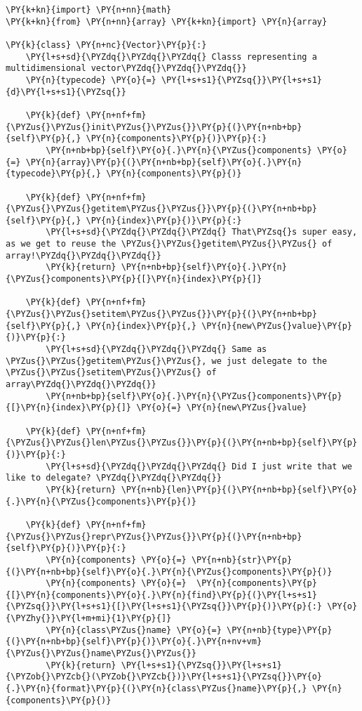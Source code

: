 \begin{Verbatim}[label=\makebox{\url{https://github.com/lucabaldini/cmepda/tree/master/slides/latex/snippets/vector\_random\_access.py}},commandchars=\\\{\}]
\PY{k+kn}{import} \PY{n+nn}{math}
\PY{k+kn}{from} \PY{n+nn}{array} \PY{k+kn}{import} \PY{n}{array}

\PY{k}{class} \PY{n+nc}{Vector}\PY{p}{:}
    \PY{l+s+sd}{\PYZdq{}\PYZdq{}\PYZdq{} Classs representing a multidimensional vector\PYZdq{}\PYZdq{}\PYZdq{}}    
    \PY{n}{typecode} \PY{o}{=} \PY{l+s+s1}{\PYZsq{}}\PY{l+s+s1}{d}\PY{l+s+s1}{\PYZsq{}}
    
    \PY{k}{def} \PY{n+nf+fm}{\PYZus{}\PYZus{}init\PYZus{}\PYZus{}}\PY{p}{(}\PY{n+nb+bp}{self}\PY{p}{,} \PY{n}{components}\PY{p}{)}\PY{p}{:}
        \PY{n+nb+bp}{self}\PY{o}{.}\PY{n}{\PYZus{}components} \PY{o}{=} \PY{n}{array}\PY{p}{(}\PY{n+nb+bp}{self}\PY{o}{.}\PY{n}{typecode}\PY{p}{,} \PY{n}{components}\PY{p}{)}
        
    \PY{k}{def} \PY{n+nf+fm}{\PYZus{}\PYZus{}getitem\PYZus{}\PYZus{}}\PY{p}{(}\PY{n+nb+bp}{self}\PY{p}{,} \PY{n}{index}\PY{p}{)}\PY{p}{:}
        \PY{l+s+sd}{\PYZdq{}\PYZdq{}\PYZdq{} That\PYZsq{}s super easy, as we get to reuse the \PYZus{}\PYZus{}getitem\PYZus{}\PYZus{} of array!\PYZdq{}\PYZdq{}\PYZdq{}}
        \PY{k}{return} \PY{n+nb+bp}{self}\PY{o}{.}\PY{n}{\PYZus{}components}\PY{p}{[}\PY{n}{index}\PY{p}{]}
    
    \PY{k}{def} \PY{n+nf+fm}{\PYZus{}\PYZus{}setitem\PYZus{}\PYZus{}}\PY{p}{(}\PY{n+nb+bp}{self}\PY{p}{,} \PY{n}{index}\PY{p}{,} \PY{n}{new\PYZus{}value}\PY{p}{)}\PY{p}{:}
        \PY{l+s+sd}{\PYZdq{}\PYZdq{}\PYZdq{} Same as \PYZus{}\PYZus{}getitem\PYZus{}\PYZus{}, we just delegate to the \PYZus{}\PYZus{}setitem\PYZus{}\PYZus{} of array\PYZdq{}\PYZdq{}\PYZdq{}}
        \PY{n+nb+bp}{self}\PY{o}{.}\PY{n}{\PYZus{}components}\PY{p}{[}\PY{n}{index}\PY{p}{]} \PY{o}{=} \PY{n}{new\PYZus{}value}
    
    \PY{k}{def} \PY{n+nf+fm}{\PYZus{}\PYZus{}len\PYZus{}\PYZus{}}\PY{p}{(}\PY{n+nb+bp}{self}\PY{p}{)}\PY{p}{:}
        \PY{l+s+sd}{\PYZdq{}\PYZdq{}\PYZdq{} Did I just write that we like to delegate? \PYZdq{}\PYZdq{}\PYZdq{}}
        \PY{k}{return} \PY{n+nb}{len}\PY{p}{(}\PY{n+nb+bp}{self}\PY{o}{.}\PY{n}{\PYZus{}components}\PY{p}{)}
    
    \PY{k}{def} \PY{n+nf+fm}{\PYZus{}\PYZus{}repr\PYZus{}\PYZus{}}\PY{p}{(}\PY{n+nb+bp}{self}\PY{p}{)}\PY{p}{:}
        \PY{n}{components} \PY{o}{=} \PY{n+nb}{str}\PY{p}{(}\PY{n+nb+bp}{self}\PY{o}{.}\PY{n}{\PYZus{}components}\PY{p}{)}
        \PY{n}{components} \PY{o}{=}  \PY{n}{components}\PY{p}{[}\PY{n}{components}\PY{o}{.}\PY{n}{find}\PY{p}{(}\PY{l+s+s1}{\PYZsq{}}\PY{l+s+s1}{[}\PY{l+s+s1}{\PYZsq{}}\PY{p}{)}\PY{p}{:} \PY{o}{\PYZhy{}}\PY{l+m+mi}{1}\PY{p}{]}
        \PY{n}{class\PYZus{}name} \PY{o}{=} \PY{n+nb}{type}\PY{p}{(}\PY{n+nb+bp}{self}\PY{p}{)}\PY{o}{.}\PY{n+nv+vm}{\PYZus{}\PYZus{}name\PYZus{}\PYZus{}}
        \PY{k}{return} \PY{l+s+s1}{\PYZsq{}}\PY{l+s+s1}{\PYZob{}\PYZcb{}(\PYZob{}\PYZcb{})}\PY{l+s+s1}{\PYZsq{}}\PY{o}{.}\PY{n}{format}\PY{p}{(}\PY{n}{class\PYZus{}name}\PY{p}{,} \PY{n}{components}\PY{p}{)}
\end{Verbatim}